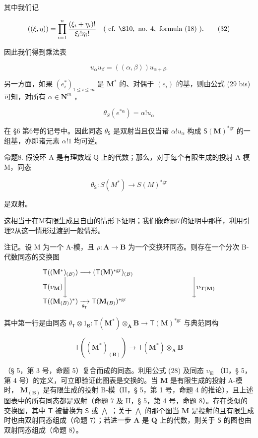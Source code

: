其中我们记

\[
((\xi , \eta)) = \prod_ {i = 1} ^ {n} \frac {(\xi_ {i} + \eta_ {i}) !}{\xi_ {i} ! \eta_ {i} !} \quad (\text { cf.   } \S 10, \text {   no.   } 4, \text {   formula   (18) }).\tag{32}
\]

因此我们得到乘法表

\[
u _ {\alpha} u _ {\beta} = ((\alpha , \beta)) u _ {\alpha + \beta}.\tag{33}
\]

另一方面，如果 \((e_i^*)_{1\leq i\leq m}\) 是 \(\mathbf{M}^*\) 的、对偶于 \((e_i)\) 的基，则由公式 (29 bis) 可知，对所有 \(\alpha \in \mathbf{N}^m\) ，

\[
\theta_ {S} (e ^ {* \alpha}) = \alpha ! u _ {\alpha}\tag{34}
\]

在 §6 第6号的记号中。因此同态 \(\theta_{\mathsf{S}}\) 是双射当且仅当诸 \(\alpha!u_{\alpha}\) 构成 \(\mathsf{S}(\mathbf{M})^{*\mathrm{gr}}\) 的一组基，亦即诸元素 \(\alpha!1\) 均可逆。

命题8. 假设环 A 是有理数域 Q 上的代数；那么，对于每个有限生成的投射 A-模 M，同态

\[
\theta_ {\mathsf {S}}: S (M ^ {*}) \rightarrow S (M) ^ {* \mathrm{gr}}
\]

是双射。

这相当于在M有限生成且自由的情形下证明；我们像命题7的证明中那样，利用引理2从这一情形过渡到一般情形。

注记。设 M 为一个 A-模，且 \(\rho: \mathbf{A} \to \mathbf{B}\) 为一个交换环同态。则存在一个分次 B-代数同态的交换图

\[
\begin{array}{l} \mathsf {T} ((\mathbf {M} ^ {*}) _ {(B)}) \longrightarrow (\mathsf {T} (\mathbf {M}) ^ {* \mathrm{gr}}) _ {(B)} \\ \mathsf {T} (\upsilon_ {\mathbf {M}}) \Biggl \downarrow \qquad \qquad \qquad \qquad \qquad \qquad \qquad \qquad \qquad \Biggl \downarrow \upsilon_ {\mathbf {T} (\mathbf {M})} \\ \mathsf {T} ((\mathbf {M} _ {(B)}) ^ {*}) \xrightarrow [ \theta_ {\mathsf {T}} ]{} \mathsf {T} (\mathbf {M} _ {(B)}) ^ {* \mathrm{gr}} \end{array}
\]

其中第一行是由同态 \(\theta_{\mathsf{T}}\otimes 1_{\mathsf{B}}\colon \mathsf{T}(\mathbf{M}^{*})\otimes_{\mathbf{A}}\mathbf{B}\to \mathsf{T}(\mathbf{M})^{*\mathrm{gr}}\) 与典范同构

\[
\mathsf {T} ((\mathbf {M} ^ {*}) _ {(\mathbf {B})}) \rightarrow \mathsf {T} (\mathbf {M} ^ {*}) \otimes_ {\mathbf {A}} \mathbf {B}
\]

（§ 5，第 3 号，命题 5）复合而成的同态。利用公式 (28) 及同态 \(\upsilon_{\mathbf{E}}\) （II，§ 5，第 4 号）的定义，可立即验证此图表是交换的。当 \(\mathbf{M}\) 是有限生成的投射 A-模时， \(\mathbf{M}_{(\mathbf{B})}\) 是有限生成的投射 B-模（II，§ 5，第 1 号，命题 4 的推论），且上述图表中的所有同态都是双射（命题 7 及 II，§ 5，第 4 号，命题 8）。存在类似的交换图，其中 \(\mathsf{T}\) 被替换为 \(\mathsf{S}\) 或 \(\bigwedge\) ；关于 \(\bigwedge\) 的那个图当 \(\mathbf{M}\) 是投射的且有限生成时也由双射同态组成（命题 7）；若进一步 \(\mathbf{A}\) 是 \(\mathbf{Q}\) 上的代数，则关于 \(\mathsf{S}\) 的图也由双射同态组成（命题 8）。

